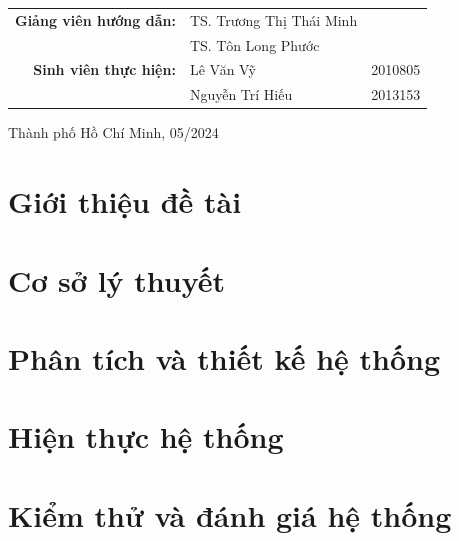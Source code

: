 \documentclass[a4paper]{report}
\begin{document}
\begin{titlepage}
	\begin{table}[H]
		\centering
		\begin{tabular}{rll}
			\textbf{Giảng viên hướng dẫn:} & TS. Trương Thị Thái Minh &         \\
			                               & TS. Tôn Long Phước       &         \\
			\textbf{Sinh viên thực hiện:}  & Lê Văn Vỹ                & 2010805 \\
			                               & Nguyễn Trí Hiếu          & 2013153 \\
		\end{tabular}
	\end{table}

	\vspace{3cm}
	\begin{center}
		{\footnotesize Thành phố Hồ Chí Minh, 05/2024}
	\end{center}
\end{titlepage}
\vspace{20cm}

\pagebreak

\pagebreak
\tableofcontents
\pagebreak
{}
\pagebreak
\makeatletter
\makeatother
\listoffigures
\pagebreak
\listoftables
\pagebreak
\printnoidxglossary[type=\acronymtype,title=Danh sách từ ngữ viết tắt]
\pagebreak


\chapter{Giới thiệu đề tài}

\newpage
\chapter{Cơ sở lý thuyết}

\newpage
\chapter{Phân tích và thiết kế hệ thống}

\newpage
\chapter{Hiện thực hệ thống}

\newpage
\chapter{Kiểm thử và đánh giá hệ thống}

\newpage

\newpage

\end{document}
